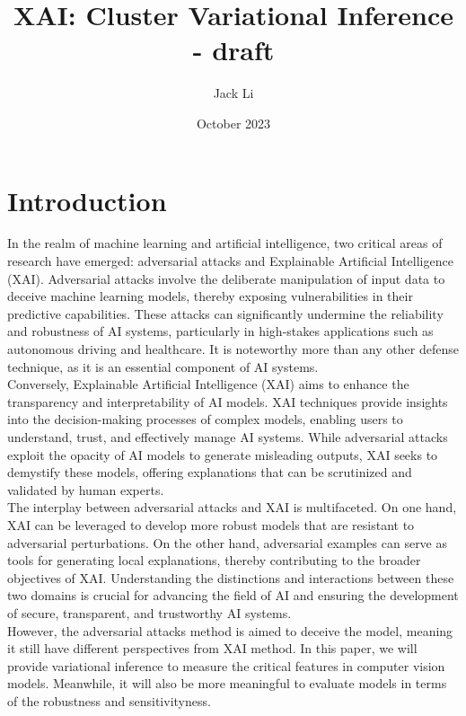 \documentclass[12pt]{article}
\title{XAI: Cluster Variational Inference - draft}
\author{Jack Li}
\date{October 2023}
\begin{document}
\maketitle

\section{Introduction}

In the realm of machine learning and artificial intelligence, two critical areas of research have emerged: adversarial attacks and Explainable Artificial Intelligence (XAI). 
Adversarial attacks involve the deliberate manipulation of input data to deceive machine learning models, thereby exposing vulnerabilities in their predictive capabilities\cite{Goodfellow2015}\cite{Kurakin2017}. 
These attacks can significantly undermine the reliability and robustness of AI systems, particularly in high-stakes applications such as autonomous driving and healthcare. 
It is noteworthy more than any other defense technique, as it is an essential component of AI systems\cite{Ross2017}\cite{Carlini2017}.\\

Conversely, Explainable Artificial Intelligence (XAI) aims to enhance the transparency and interpretability of AI models\cite{Comaniciu2002}. 
XAI techniques provide insights into the decision-making processes of complex models, enabling users to understand, trust, and effectively manage AI systems.
While adversarial attacks exploit the opacity of AI models to generate misleading outputs, XAI seeks to demystify these models, offering explanations that can be scrutinized and validated by human experts. \\

The interplay between adversarial attacks and XAI is multifaceted. On one hand, XAI can be leveraged to develop more robust models that are resistant to adversarial perturbations. 
On the other hand, adversarial examples can serve as tools for generating local explanations, thereby contributing to the broader objectives of XAI.
Understanding the distinctions and interactions between these two domains is crucial for advancing the field of AI and ensuring the development of secure, transparent, and trustworthy AI systems. \\

However, the adversarial attacks method is aimed to deceive the model, meaning it still have different perspectives from XAI method. In this paper, we will provide variational inference to measure the critical features in computer vision models. 
Meanwhile, it will also be more meaningful to evaluate models in terms of the robustness and sensitivityness. \\
\end{document}

